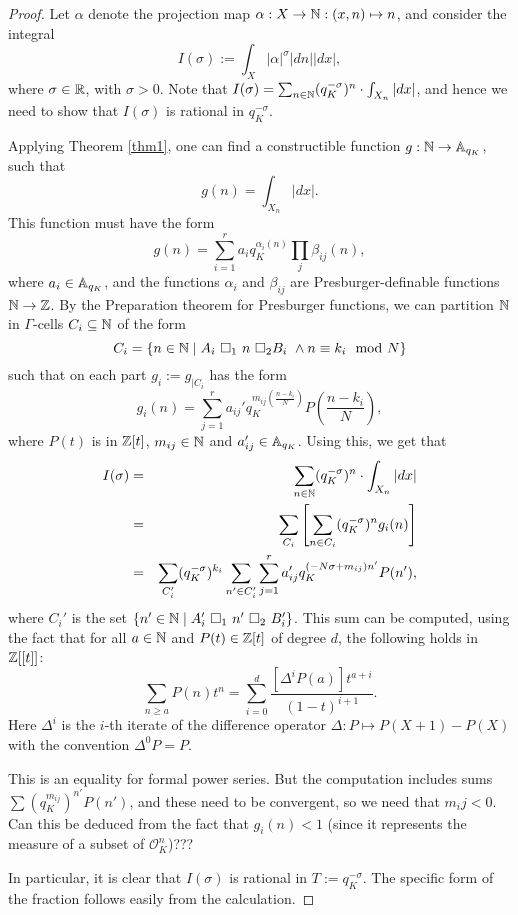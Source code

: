 \begin{proof}
Let $\alpha$ denote the projection map $\alpha:X\to \NN: (x,n) \mapsto n$, and consider the integral
\[I(\sigma):= \int_X|\alpha|^\sigma|dn||dx|,\]
where $\sigma \in \RR$, with $\sigma>0$. Note that  $I(\sigma) =\sum_{n\in\NN}(q_K^{-\sigma})^{n}\cdot \int_{X_n}|dx|$, and hence we need to show that $I(\sigma)$ is rational in $q_K^{-\sigma}$.

Applying Theorem \ref{thm1}, one can find a constructible function $g: \NN \to \AA_{q_K}$, such that
\[g(n) = \int_{X_n}|dx|.\]
This function must have the form 
\[g(n) = \sum_{i=1}^r a_iq_K^{\alpha_i(n)}\prod_j\beta_{ij}(n),\]
where $a_i \in \AA_{q_K}$, and the functions $\alpha_i$ and $\beta_{ij}$ are Presburger-definable functions $\NN \to \ZZ$. By the Preparation theorem for Presburger functions, we can partition $\N$ in $\Gamma$-cells $C_i \subseteq \N$ of the form
\[C_i = \{ n \in \N \mid A_i \ \square_1 \ n \ \square_2 B_i \ \wedge n \equiv k_i \mod N \}\]
 such that on each part $g_i:= g_{|C_i}$ has the form 
\[g_i(n) = \sum_{j=1}^r a_{ij}'q_K^{m_{ij}(\frac{n-k_i}{N})}P\left(\frac{n-k_i}{N}\right),\]
where $P(t)$ is in $\Z[t]$, $m_{ij} \in \N$ and $a_{ij}' \in \AA_{q_K}$. Using this, we get that
\begin{eqnarray*}
I(\sigma) &=& \sum_{n\in\NN}(q_K^{-\sigma})^{n}\cdot \int_{X_n}|dx|\\
&=& \sum_{ C_i}\left[ \sum_{n \in C_i} (q_K^{-\sigma})^{n}g_i(n)\right]\\
&=&\sum_{C_i'}(q_K^{-\sigma})^{k_i} \sum_{n' \in C_i'}\sum_{j=1}^r a_{ij}'q_K^{(-N\sigma +m_{ij})n'}P(n'),
\end{eqnarray*}
where $C_i'$ is the set $\{n'\in \N \mid A_i'\ \square_1 \ n' \ \square_2 \ B_i'\}$. This sum can be computed, using the fact that for all $a \in \N$ and $P(t) \in \Z[t]$ of degree $d$, the following holds in $\Z[[t]]$:
\[\sum_{n \geqslant a} P(n)t^n =\sum_{i=0}^d	\frac{[\Delta^iP(a)]t^{a+i}}{(1 - t )^{i+1}}.\]
Here $\Delta^i$ is the $i$-th iterate of the difference operator $\Delta:P \mapsto P(X + 1) - P(X)$ with the convention $\Delta^0P = P$.

{\color{red} This is an equality for formal power series. But the computation includes sums $\sum (q_K^{m_{ij}})^{n'}P(n')$, and these need to be convergent, so we need that $m_ij <0$. Can this be deduced from the fact that $g_i(n)<1$ (since it represents the measure of a subset of $\mathcal{O}_K^n$)??? }
 
In particular, it is clear that $I(\sigma)$ is rational in $T:=q_K^{-\sigma}$. The specific form of the fraction follows easily from the calculation.
\end{proof}
